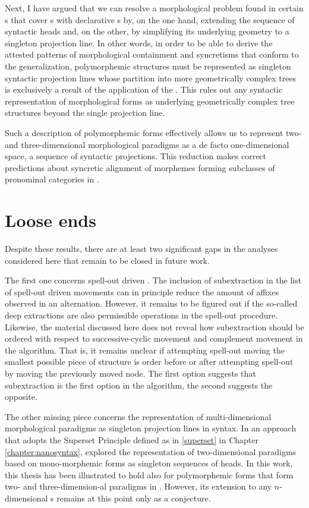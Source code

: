 \par 
Next, I have argued that we can resolve a morphological  problem found in certain  s that cover s with declarative s by, on the one hand, extending the sequence of syntactic heads  and, on the other, by simplifying its underlying geometry to a singleton projection line. In other words, in order to be able to derive the attested patterns of morphological containment and syncretisms that conform to the  generalization, polymorphemic structures must be represented as singleton syntactic projection lines whose partition into more geometrically complex trees is exclusively a result of the application of the . This rules out any syntactic representation of morphological forms as underlying geometrically complex tree structures beyond the single projection line.
\par
Such a description of polymorphemic forms effectively allows us to represent two- and three-dimensional morphological paradigms as a de facto one-dimensional space, a sequence of syntactic projections. This reduction makes correct predictions about syncretic alignment of  morphemes forming subclasses of pronominal categories in .

\section{Loose ends}

Despite these results, there are at least two significant gaps in the analyses considered here that remain to be closed in future work.
\par
The first one concerns spell-out driven . The inclusion of subextraction in the list of spell-out driven movements can in principle reduce  the amount of affixes observed in an alternation. However, it remains to be figured out if the so-called deep extractions are also permissible operations in the spell-out procedure. Likewise, the material discussed here does not reveal how subextraction should be ordered with respect to successive-cyclic movement and complement movement in the algorithm.  That is, it remains unclear if attempting spell-out moving the smallest possible piece of structure is order before or after attempting spell-out by moving the previously moved node. The first option suggests that subextraction is the first option in the algorithm, the second suggests the opposite.
\par
The other missing piece concerns the representation of multi-dimensional morphological paradigms as singleton projection lines in syntax. In an approach that adopts the Superset Principle defined as in \ref{superset} in Chapter \ref{chapter:nanosyntax}, \cite{CahaPantcheva2012} explored the representation of two-dimensional paradigms based on mono-morphemic forms as singleton sequences of heads. In this work, this thesis has been illustrated to hold also for polymorphemic forms that form two- and three-dimension-al paradigms in . However, its extension to any $n$-dimensional s remains at this point only as a conjecture.
 
